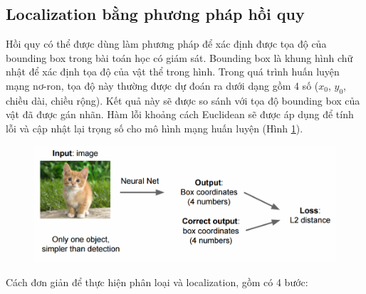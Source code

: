 \subsection{Localization bằng phương pháp hồi quy}
Hồi quy có thể được dùng làm phương pháp để xác định được tọa độ của bounding box trong bài toán học có giám sát. Bounding box là khung hình chữ nhật để xác định tọa độ của vật thể trong hình. Trong quá trình huấn luyện mạng nơ-ron, tọa độ này thường được dự đoán ra dưới dạng gồm 4 số ($x_0$, $y_0$, chiều dài, chiều rộng). Kết quả này sẽ được so sánh với tọa độ bounding box của vật đã được gán nhãn. Hàm lỗi khoảng cách Euclidean sẽ được áp dụng để tính lỗi và cập nhật lại trọng số cho mô hình mạng huấn luyện (Hình \ref{fig:2.22}).
\begin{center}
    \begin{figure}[H]
    \centering
    \includegraphics[width=0.8\columnwidth]{images/chap2/localization_1.png}
    \label{fig:2.22}
    \end{figure}
\end{center}
Cách đơn giản để thực hiện phân loại và localization, gồm có 4 bước:\\
